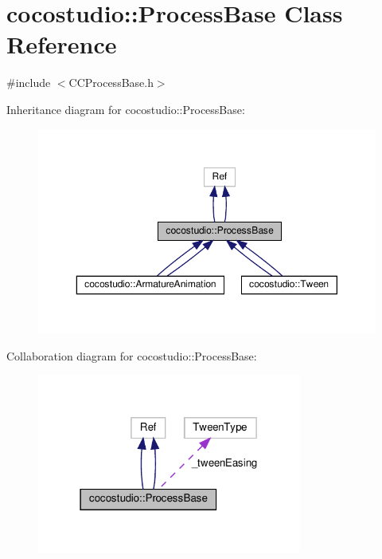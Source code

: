 \hypertarget{classcocostudio_1_1ProcessBase}{}\section{cocostudio\+:\+:Process\+Base Class Reference}
\label{classcocostudio_1_1ProcessBase}


{\ttfamily \#include $<$C\+C\+Process\+Base.\+h$>$}



Inheritance diagram for cocostudio\+:\+:Process\+Base\+:
\nopagebreak
\begin{figure}[H]
\begin{center}
\leavevmode
\includegraphics[width=350pt]{classcocostudio_1_1ProcessBase__inherit__graph}
\end{center}
\end{figure}


Collaboration diagram for cocostudio\+:\+:Process\+Base\+:
\nopagebreak
\begin{figure}[H]
\begin{center}
\leavevmode
\includegraphics[width=247pt]{classcocostudio_1_1ProcessBase__coll__graph}
\end{center}
\end{figure}
